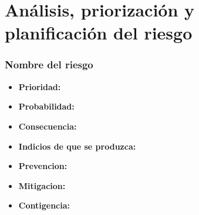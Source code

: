 \documentclass[spanish,a4paper,12pt]{report}	%
\begin{document}
\newpage
\mbox{}
\thispagestyle{empty}						%
\newpage
\setcounter{section}{0}

\part{Análisis, priorización y planificación del riesgo}  %

\section*{Nombre del riesgo}			%
	\begin{itemize}				%
		\item \textbf {Prioridad: }
		\item \textbf {Probabilidad: }
		\item \textbf {Consecuencia: }
		\item \textbf {Indicios de que se produzca: }
		\item \textbf {Prevencion: }
		\item \textbf {Mitigacion: }
		\item \textbf {Contigencia: }
	\end{itemize}






\newpage
\mbox{}
\thispagestyle{empty}						%
\newpage
\newpage
\end{document}
